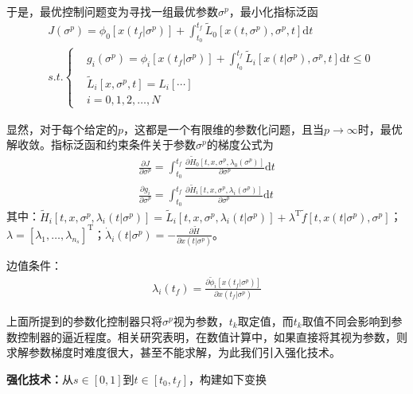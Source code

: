             于是，最优控制问题变为寻找一组最优参数$\sigma^p$，最小化指标泛函
            \begin{align*}
            & J(\sigma^p) = \phi_0[x(t_f|\sigma^p)]+\int_{t_0}^{t_f}\tilde{L}_0[x(t,\sigma^p),\sigma^p,t]\mathrm{d}t\\
            & s.t.\left\{
            \begin{aligned}
            & g_i(\sigma^p) = \phi_i[x(t_f|\sigma^p)]+\int_{t_0}^{t_f}\tilde{L}_i[x(t|\sigma^p),\sigma^p,t]\mathrm{d}t \leqslant 0\\
            & \tilde{L}_i[x,\sigma^p,t] = L_i[\cdots]\\
            & i=0,1,2,\dots,N
            \end{aligned}
            \right.
            \end{align*}
            \par
            显然，对于每个给定的$p$，这都是一个有限维的参数化问题，且当$p\to \infty$时，最优解收敛。指标泛函和约束条件关于参数$\sigma^p$的梯度公式为
            \begin{align*}
            \frac{\partial J}{\partial \sigma^p} = \int_{t_0}^{t_f}\frac{\partial \tilde{H}_0[t,x,\sigma^p,\lambda_0(\sigma^p)]}{\partial \sigma^p}\mathrm{d}t\\
            \frac{\partial g_i}{\partial \sigma^p} = \int_{t_0}^{t_f}\frac{\partial \tilde{H}_i[t,x,\sigma^p,\lambda_i(\sigma^p)]}{\partial \sigma^p}\mathrm{d}t
            \end{align*}
            其中：$\tilde{H}_i[t,x,\sigma^p,\lambda_i(t|\sigma^p)] = \tilde{L}_i[t,x,\sigma^p,\lambda_i(t|\sigma^p)]+\lambda^\mathrm{T}\tilde{f}[t,x(t|\sigma^p),\sigma^p]$；$\lambda = [\lambda_1,\dots,\lambda_{n_s}]^\mathrm{T}$；$\dot{\lambda}_{i}(t|\sigma^p) = -\frac{\partial \tilde{H}}{\partial x(t|\sigma^p)}$。
            \par
            边值条件：
            \begin{align*}
            \lambda_i(t_f) = \frac{\partial \tilde{\phi}_i[x(t_f|\sigma^p)]}{\partial x(t_f|\sigma^p)}
            \end{align*}
            \par
            上面所提到的参数化控制器只将$\sigma^p$视为参数，$t_k$取定值，而$t_k$取值不同会影响到参数控制器的逼近程度。相关研究表明，在数值计算中，如果直接将其视为参数，则求解参数梯度时难度很大，甚至不能求解，为此我们引入强化技术。
            \par
            \textbf{强化技术：}从$s\in [0,1]$到$t\in [t_0,t_f]$，构建如下变换
